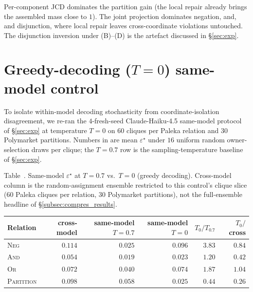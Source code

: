 \documentclass{article}
\theoremstyle{plain}
\theoremstyle{definition}
\theoremstyle{remark}
\newcommand{\eps}{\varepsilon}
\begin{document}
Per-component JCD dominates the partition gain (the local repair already brings
the assembled mass close to $1$). The joint projection dominates negation, and,
and disjunction, where local repair leaves cross-coordinate violations untouched.
The disjunction inversion under (B)--(D) is the artefact discussed in
\S\ref{sec:exp}.

\section{Greedy-decoding ($T\!=\!0$) same-model control}
\label{app:t0_control}

To isolate within-model decoding stochasticity from
coordinate-isolation disagreement, we re-ran the $4$-fresh-seed
Claude-Haiku-4.5 same-model protocol of \S\ref{sec:exp} at
temperature $T\!=\!0$ on $60$ cliques per Paleka relation and $30$
Polymarket partitions. Numbers in  are mean $\eps^\star$
under $16$ uniform random owner-selection draws per clique; the
$T\!=\!0.7$ row is the sampling-temperature baseline of \S\ref{sec:exp}.

\begin{center}
\label{tab:t0}
{\small Table~\thetable. Same-model $\eps^\star$ at $T\!=\!0.7$ vs.\ $T\!=\!0$ (greedy decoding). Cross-model column is the random-assignment ensemble restricted to this control's clique slice ($60$ Paleka cliques per relation, $30$ Polymarket partitions), not the full-ensemble headline of \S\ref{subsec:compres_results}.\par}
\small
\begin{tabular}{lrrrrr}
\toprule
Relation & cross-model & same-model $T\!=\!0.7$ & same-model $T\!=\!0$ & $T_0/T_{0.7}$ & $T_0/$cross \\
\midrule
\textsc{Neg}       & $0.114$ & $0.025$ & $0.096$ & $3.83$ & $0.84$ \\
\textsc{And}       & $0.054$ & $0.019$ & $0.023$ & $1.20$ & $0.42$ \\
\textsc{Or}        & $0.072$ & $0.040$ & $0.074$ & $1.87$ & $1.04$ \\
\textsc{Partition} & $0.098$ & $0.058$ & $0.025$ & $0.44$ & $0.26$ \\
\bottomrule
\end{tabular}
\end{center}
\end{document}
